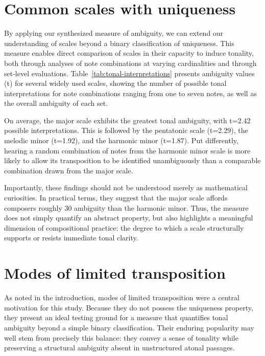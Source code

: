 \documentclass[10pt,twocolumn]{article}
\numberwithin{equation}{section} %
\begin{document}
\section{Common scales with uniqueness}

By applying our synthesized measure of ambiguity, we can
extend our understanding of scales beyond a binary classification of
uniqueness. This measure enables direct comparison of scales in their capacity
to induce tonality, both through analyses of note combinations at varying
cardinalities and through set‑level evaluations. Table~\ref{tab:tonal-interpretations}
presents ambiguity values (t) for several widely used scales, showing the
number of possible tonal interpretations for note combinations ranging from one
to seven notes, as well as the overall ambiguity of each set.

On average, the major scale exhibits the greatest tonal
ambiguity, with t=2.42 possible interpretations. This is followed by the
pentatonic scale (t=2.29), the melodic minor (t=1.92), and the harmonic minor
(t=1.87). Put differently, hearing a random combination of notes from the
harmonic minor scale is more likely to allow its transposition to be identified
unambiguously than a comparable combination drawn from the major scale.

Importantly, these findings should not be understood merely
as mathematical curiosities. In practical terms, they suggest that the major
scale affords composers roughly 30%
ambiguity than the harmonic minor. Thus, the measure does not simply quantify
an abstract property, but also highlights a meaningful dimension of
compositional practice: the degree to which a scale structurally supports or
resists immediate tonal clarity.



\section{Modes of limited transposition}

As noted in the introduction, modes of limited transposition
were a central motivation for this study. Because they do not possess the
uniqueness property, they present an ideal testing ground for a measure that
quantifies tonal ambiguity beyond a simple binary classification. Their
enduring popularity may well stem from precisely this balance: they convey a
sense of tonality while preserving a structural ambiguity absent in
unstructured atonal passages.
\end{document}

